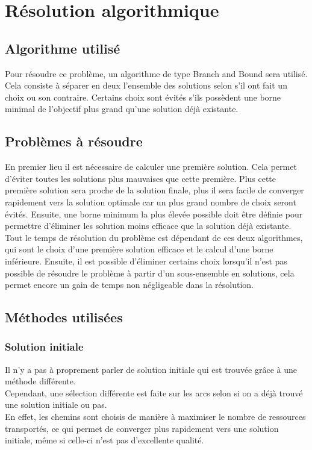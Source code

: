\documentclass[a4paper, 12pt]{report}
\begin{document}
\chapter{Résolution algorithmique}
\section{Algorithme utilisé}

Pour résoudre ce problème, un algorithme de type Branch and Bound sera utilisé.
Cela consiste à séparer en deux l'ensemble des solutions selon s'il ont fait un choix ou son contraire.
Certains choix sont évités s'ils possèdent une borne minimal de l'objectif plus grand qu'une solution déjà existante. 

\section{Problèmes à résoudre}
En premier lieu il est nécessaire de calculer une première solution. 
Cela permet d'éviter toutes les solutions plus mauvaises que cette première.
Plus cette première solution sera proche de la solution finale, 
plus il sera facile de converger rapidement vers la solution optimale car un plus grand nombre de choix seront évités.
\newline{}
\newline{}
Ensuite, une borne minimum la plus élevée possible doit être définie 
pour permettre d'éliminer les solution moins efficace que la solution déjà existante. 
Tout le temps de résolution du problème est dépendant de ces deux algorithmes, 
qui sont le choix d'une première solution efficace et le calcul d'une borne inférieure. 
\newline{}
\newline{}
Ensuite, il est possible d'éliminer certains choix lorsqu'il n'est pas possible de résoudre le problème 
à partir d'un sous-ensemble en solutions, cela permet encore un gain de temps non négligeable dans la résolution.

\section{Méthodes utilisées}
\subsection{Solution initiale}
Il n'y a pas à proprement parler de solution initiale qui est trouvée grâce à une méthode différente.\\
Cependant, une sélection différente est faite sur les arcs selon si on a déjà trouvé une solution initiale ou pas.\\
En effet, les chemins sont choisis de manière à maximiser le nombre de ressources transportés, 
ce qui permet de converger plus rapidement vers une solution initiale, même si celle-ci n'est pas d'excellente qualité.\\
\end{document}
